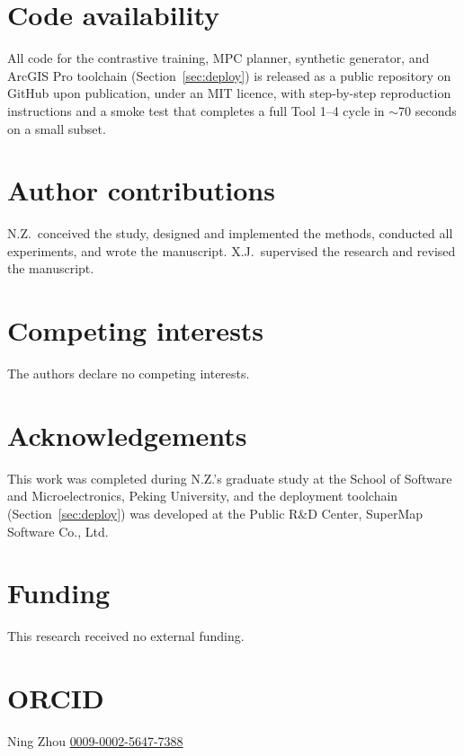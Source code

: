 \documentclass[11pt]{article}
\begin{document}
\section*{Code availability}
All code for the contrastive training, MPC planner, synthetic generator, and ArcGIS Pro toolchain (Section~\ref{sec:deploy}) is released as a public repository on GitHub upon publication, under an MIT licence, with step-by-step reproduction instructions and a smoke test that completes a full Tool 1--4 cycle in $\sim$70 seconds on a small subset.

\section*{Author contributions}
N.Z.\ conceived the study, designed and implemented the methods, conducted all experiments, and wrote the manuscript. X.J.\ supervised the research and revised the manuscript.

\section*{Competing interests}
The authors declare no competing interests.

\section*{Acknowledgements}
This work was completed during N.Z.'s graduate study at the School of Software and Microelectronics, Peking University, and the deployment toolchain (Section~\ref{sec:deploy}) was developed at the Public R\&D Center, SuperMap Software Co., Ltd.

\section*{Funding}
This research received no external funding.

\section*{ORCID}
Ning Zhou \href{https://orcid.org/0009-0002-5647-7388}{0009-0002-5647-7388}


\end{document}
